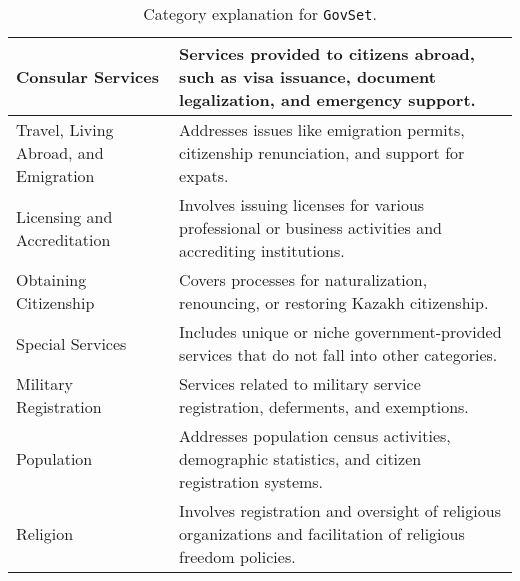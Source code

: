 \begin{table*}
\begin{tabular}{p{}p{}}
Consular Services & Services provided to citizens abroad, such as visa issuance, document legalization, and emergency support. \\  \midrule
Travel, Living Abroad, and Emigration & Addresses issues like emigration permits, citizenship renunciation, and support for expats. \\  \midrule
Licensing and Accreditation & Involves issuing licenses for various professional or business activities and accrediting institutions. \\  \midrule
Obtaining Citizenship & Covers processes for naturalization, renouncing, or restoring Kazakh citizenship. \\  \midrule
Special Services & Includes unique or niche government-provided services that do not fall into other categories. \\  \midrule
Military Registration & Services related to military service registration, deferments, and exemptions. \\  \midrule
Population & Addresses population census activities, demographic statistics, and citizen registration systems. \\  \midrule
Religion & Involves registration and oversight of religious organizations and facilitation of religious freedom policies. \\  
\bottomrule
\end{tabular}
    \caption{Category explanation for \texttt{GovSet}.}
    \label{tab:category_exp_gov}
\end{table*}




